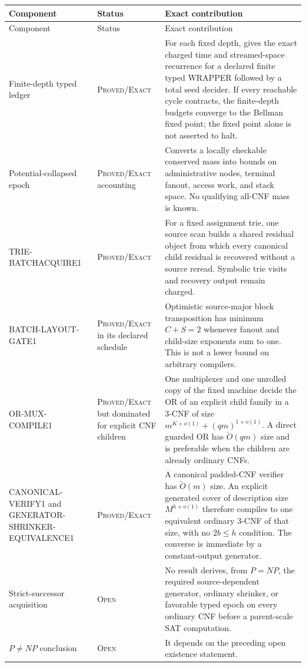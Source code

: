 \documentclass[11pt]{article}
\newcommand{\Exact}{\textsc{Proved/Exact}}
\newcommand{\Open}{\textsc{Open}}
\begin{document}
\begin{longtable}{L{0.24\textwidth}L{0.18\textwidth}L{0.50\textwidth}}
\toprule
Component & Status & Exact contribution \\
\midrule
\endfirsthead
\toprule
Component & Status & Exact contribution \\
\midrule
\endhead
\bottomrule
\endfoot
Finite-depth typed ledger & \Exact{} & For each fixed depth, gives the exact
charged time and streamed-space recurrence for a declared finite typed
WRAPPER followed by a total seed decider.  If every reachable cycle
contracts, the finite-depth budgets converge to the Bellman fixed point; the
fixed point alone is not asserted to halt. \\
Potential-collapsed epoch & \Exact{} accounting & Converts a locally
checkable conserved mass into bounds on administrative nodes, terminal
fanout, access work, and stack space.  No qualifying all-CNF mass is known.
\\
TRIE-BATCHACQUIRE1 & \Exact{} & For a fixed assignment trie, one source scan
builds a shared residual object from which every canonical child residual is
recovered without a source reread.  Symbolic trie visits and recovery output
remain charged. \\
BATCH-LAYOUT-GATE1 & \Exact{} in its declared schedule & Optimistic
source-major block transposition has minimum $C+S=2$ whenever fanout and
child-size exponents sum to one.  This is not a lower bound on arbitrary
compilers. \\
OR-MUX-COMPILE1 & \Exact{} but dominated for explicit CNF children & One
multiplexer and one unrolled copy of the fixed machine decide the OR of an
explicit child family in a 3-CNF of size
$m^{K+o(1)}+(qm)^{1+o(1)}$.  A direct guarded OR has
$\widetilde O(qm)$ size and is preferable when the children are already
ordinary CNFs. \\
CANONICAL-VERIFY1 and GENERATOR-SHRINKER-EQUIVALENCE1 & \Exact{} & A
canonical padded-CNF verifier has $\widetilde O(m)$ size.  An explicit
generated cover of description size $M^{h+o(1)}$ therefore compiles to one
equivalent ordinary 3-CNF of that size, with no $2b\le h$ condition.  The
converse is immediate by a constant-output generator. \\
Strict-successor acquisition & \Open{} & No result derives, from $P=NP$, the
required source-dependent generator, ordinary shrinker, or favorable typed
epoch on every ordinary CNF before a parent-scale SAT computation. \\
$P\ne NP$ conclusion & \Open{} & It depends on the preceding open
existence statement. \\
\end{longtable}
\end{document}
